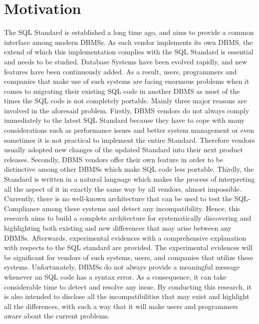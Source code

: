  \section{Motivation}
 The SQL Standard is established a long time ago, and aims to provide a common interface among modern DBMSs. As each vendor implements its own DBMS, the extend of which this implementation complies with the SQL Standard is essential and needs to be studied. Database Systems have been evolved rapidly, and new features have been continuously added. As a result, users, programmers and companies that make use of such systems are facing enormous problems when it comes to migrating their existing SQL code in another DBMS as most of the times the SQL code is not completely portable. Mainly three major reasons are involved in the aforesaid problem.  Firstly, DBMS vendors do not always comply immediately to the latest SQL Standard because they have to cope with many considerations such as performance issues and better system management or even sometimes it is not practical to implement the entire Standard. Therefore vendors usually adopted new changes of the updated Standard into their next product releases. Secondly, DBMS vendors offer their own feature in order to be distinctive among other DBMSs which make SQL code less portable. Thirdly, the Standard is written in a natural language which makes the process of interpreting all the aspect of it in exactly the same way by all vendors, almost impossible.  Currently, there is no well-known architecture that can be used to test the SQL-Compliance among these systems and detect any incompatibility. Hence, this research aims to build a complete architecture for systematically discovering and highlighting both existing and new differences that may arise between any DBMSs. Afterwards, experimental evidences with a comprehensive explanation with respects to the SQL standard are provided. The experimental evidences will be significant for vendors of such systems, users, and companies that utilize these systems. Unfortunately, DBMSs do not always provide a meaningful message whenever an SQL code has a syntax error. As a consequence, it can take considerable time to detect and resolve any issue. By conducting this research, it is also intended to disclose all the incompatibilities that may exist and highlight all the differences, with such a way that it will make users and programmers aware about the current problems.


